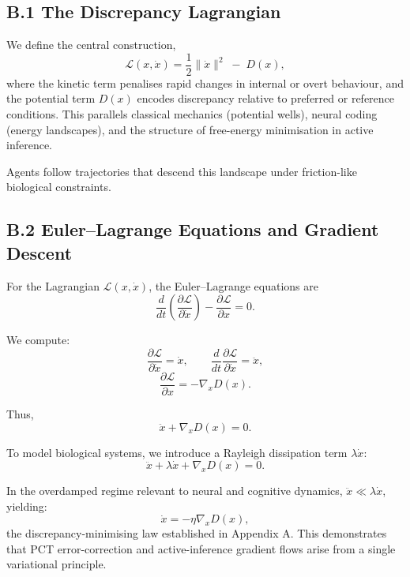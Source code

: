 \documentclass[11pt,a4paper,twoside]{article}
\begin{document}
\subsection*{B.1 The Discrepancy Lagrangian}

We define the central construction,
\[
\mathcal{L}(x,\dot{x}) = \frac{1}{2}\|\dot{x}\|^2 \;-\; D(x),
\]
where the kinetic term penalises rapid changes in internal or overt behaviour, and the potential term $D(x)$ encodes discrepancy relative to preferred or reference conditions. This parallels classical mechanics (potential wells), neural coding (energy landscapes), and the structure of free-energy minimisation in active inference.

\begin{center}
\end{center}

Agents follow trajectories that descend this landscape under friction-like biological constraints.

\subsection*{B.2 Euler--Lagrange Equations and Gradient Descent}

For the Lagrangian $\mathcal{L}(x,\dot{x})$, the Euler--Lagrange equations are
\[
\frac{d}{dt}\left(\frac{\partial \mathcal{L}}{\partial \dot{x}}\right)
- \frac{\partial \mathcal{L}}{\partial x} = 0.
\]

We compute:
\[
\frac{\partial \mathcal{L}}{\partial \dot{x}} = \dot{x}, \qquad
\frac{d}{dt}\frac{\partial \mathcal{L}}{\partial \dot{x}} = \ddot{x},
\]
\[
\frac{\partial \mathcal{L}}{\partial x} = -\nabla_x D(x).
\]

Thus,
\[
\ddot{x} + \nabla_x D(x) = 0.
\]

To model biological systems, we introduce a Rayleigh dissipation term $\lambda\dot{x}$:
\[
\ddot{x} + \lambda \dot{x} + \nabla_x D(x) = 0.
\]

In the overdamped regime relevant to neural and cognitive dynamics, $\ddot{x} \ll \lambda\dot{x}$, yielding:
\[
\dot{x} = -\eta \nabla_x D(x),
\]
the discrepancy-minimising law established in Appendix A. This demonstrates that PCT error-correction and active-inference gradient flows arise from a single variational principle.
\end{document}
